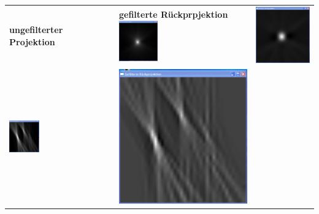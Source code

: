     	        \begin{longtable}{p{7cm}p{7cm}c}
    	                \textbf{ungefilterter Projektion} & \textbf{gefilterte Rückprpjektion} \endhead
    	                \includegraphics[width=0.3\textwidth, height=0.2\textheight]{pic/Einzelfenster_Bilder/unbekannte_Quelle/unbek1_einf_prj.png}
    	                & 
    	                \includegraphics[width=.3\textwidth, height=0.2\textheight]{pic/Einzelfenster_Bilder/unbekannte_Quelle/unbek1gef_prj.png}\\
    	                \includegraphics[width=0.3\textwidth, height=0.2\textheight]{pic/Einzelfenster_Bilder/unbekannte_Quelle/unbek2einf_prj.png}
    	                & 
    	                \includegraphics[width=.3\textwidth, height=0.2\textheight]{pic/Einzelfenster_Bilder/unbekannte_Quelle/unbek2gef_prj.png}\\ 

\end{longtable}
